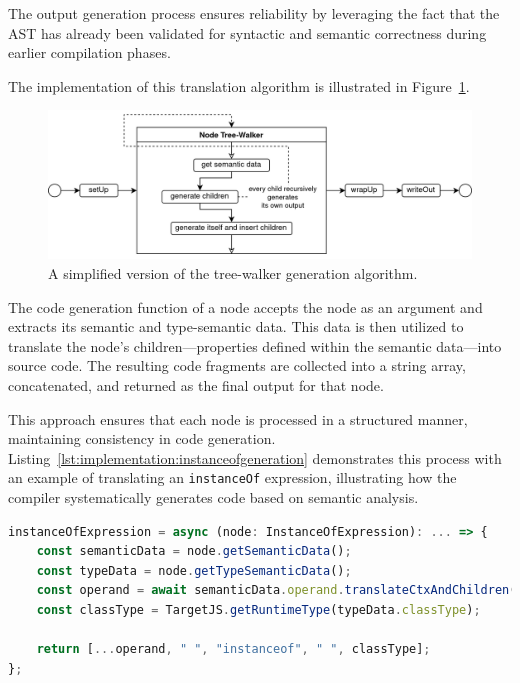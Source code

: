 The output generation process ensures reliability by leveraging the fact that the AST has already been validated for syntactic and semantic correctness during earlier compilation phases.

The implementation of this translation algorithm is illustrated in Figure~\ref{fig:implementation:translationalgorithm}.

\begin{figure}[h!]
	\centering
	\includegraphics[scale=0.9]{./pics/Output-Generation.drawio}
	\caption{A simplified version of the tree-walker generation algorithm.}
	\label{fig:implementation:translationalgorithm}
\end{figure}

The code generation function of a node accepts the node as an argument and extracts its semantic and type-semantic data. This data is then utilized to translate the node's children—properties defined within the semantic data—into source code. The resulting code fragments are collected into a string array, concatenated, and returned as the final output for that node.

This approach ensures that each node is processed in a structured manner, maintaining consistency in code generation. Listing~\ref{lst:implementation:instanceofgeneration} demonstrates this process with an example of translating an \lstinline|instanceOf| expression, illustrating how the compiler systematically generates code based on semantic analysis.

\begin{lstlisting}[language=TypeScript,caption=The code generation function of a \lstinline|instanceOf| expression,label=lst:implementation:instanceofgeneration]
instanceOfExpression = async (node: InstanceOfExpression): ... => {
	const semanticData = node.getSemanticData();
	const typeData = node.getTypeSemanticData();
	const operand = await semanticData.operand.translateCtxAndChildren();
	const classType = TargetJS.getRuntimeType(typeData.classType);

	return [...operand, " ", "instanceof", " ", classType];
};
\end{lstlisting}

